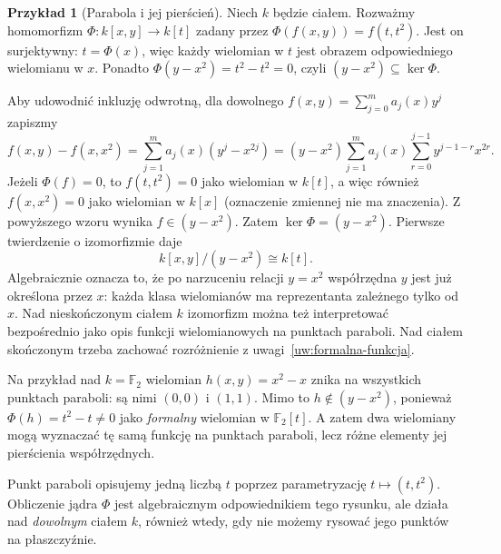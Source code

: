 \documentclass[11pt,a4paper,openany]{report}
\numberwithin{equation}{section}
\theoremstyle{plain}
\theoremstyle{definition}
\newtheorem{przyklad}[twierdzenie]{Przykład}
\theoremstyle{remark}
\newcommand{\kerf}{\operatorname{ker}}
\begin{document}
\begin{przyklad}[Parabola i jej pierścień]
\label{pr:parabola}
Niech $k$ będzie ciałem. Rozważmy homomorfizm
$\Phi\colon k[x,y]\to k[t]$ zadany przez
$\Phi(f(x,y))=f(t,t^2)$.
Jest on surjektywny: $t=\Phi(x)$, więc każdy wielomian w $t$
jest obrazem odpowiedniego wielomianu w $x$.
Ponadto $\Phi(y-x^2)=t^2-t^2=0$, czyli
$(y-x^2)\subseteq\kerf\Phi$.

Aby udowodnić inkluzję odwrotną, dla dowolnego
$f(x,y)=\sum_{j=0}^m a_j(x)y^j$ zapiszmy
\[
 f(x,y)-f(x,x^2)
 =\sum_{j=1}^m a_j(x)(y^j-x^{2j})
 =(y-x^2)\sum_{j=1}^m a_j(x)
   \sum_{r=0}^{j-1}y^{j-1-r}x^{2r}.
\]
Jeżeli $\Phi(f)=0$, to $f(t,t^2)=0$ jako wielomian w $k[t]$,
a więc również $f(x,x^2)=0$ jako wielomian w $k[x]$
(oznaczenie zmiennej nie ma znaczenia). Z powyższego wzoru
wynika $f\in(y-x^2)$. Zatem $\kerf\Phi=(y-x^2)$.
Pierwsze twierdzenie o izomorfizmie daje
\[
 k[x,y]/(y-x^2)\cong k[t].
\]
Algebraicznie oznacza to, że po narzuceniu relacji $y=x^2$
współrzędna $y$ jest już określona przez $x$: każda klasa wielomianów
ma reprezentanta zależnego tylko od $x$.
Nad nieskończonym ciałem $k$ izomorfizm można też interpretować
bezpośrednio jako opis funkcji wielomianowych na punktach paraboli.
Nad ciałem skończonym trzeba zachować rozróżnienie z
uwagi~\ref{uw:formalna-funkcja}.

\begin{samepage}
Na przykład nad $k=\mathbb F_2$ wielomian $h(x,y)=x^2-x$
znika na wszystkich punktach paraboli: są nimi
$(0,0)$ i $(1,1)$. Mimo to $h\notin(y-x^2)$,
ponieważ $\Phi(h)=t^2-t\ne0$ jako \emph{formalny}
wielomian w $\mathbb F_2[t]$. A zatem dwa wielomiany
mogą wyznaczać tę samą funkcję na punktach paraboli,
lecz różne elementy jej pierścienia współrzędnych.
\end{samepage}
\end{przyklad}

\begin{center}
\end{center}
Punkt paraboli opisujemy jedną liczbą $t$ poprzez parametryzację
$t\mapsto(t,t^2)$. Obliczenie jądra $\Phi$ jest algebraicznym
odpowiednikiem tego rysunku, ale działa nad \emph{dowolnym} ciałem $k$,
również wtedy, gdy nie możemy rysować jego punktów na płaszczyźnie.
\end{document}
